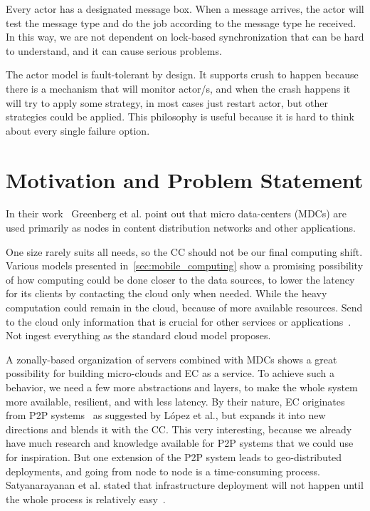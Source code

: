 Every actor has a designated message box. When a message arrives, the actor will test the message type and do the job according to the message type he received. In this way, we are not dependent on lock-based synchronization that can be hard to understand, and it can cause serious problems.

The actor model is fault-tolerant by design. It supports crush to happen because there is a  mechanism that will monitor actor/s, and when the crash happens it will try to apply some strategy, in most cases just restart actor, but other strategies could be applied. This philosophy is useful because it is hard to think about every single failure option.
%
%
\section{Motivation and Problem Statement}\label{sec:problem_statement}
%
In their work~\cite{GreenbergHMP09} Greenberg et al. point out that micro data-centers (MDCs) are used primarily as nodes in content distribution networks and other  applications.

One size rarely suits all needs, so the CC should not be our final computing shift. Various models presented in~\ref{sec:mobile_computing} show a promising possibility of how computing could be done closer to the data sources, to lower the latency for its clients by contacting the cloud only when needed. While the heavy computation could remain in the cloud, because of more available resources. Send to the cloud only information that is crucial for other services or applications~\cite{inproceedingsSimic1}. Not ingest everything as the standard cloud model proposes.

A zonally-based organization of servers combined with MDCs shows a great possibility for building micro-clouds and EC as a service. To achieve such a behavior, we need a few more abstractions and layers, to make the whole system more available, resilient, and with less latency. By their nature, EC originates from P2P systems~\cite{LopezMEDHIBFR15} as suggested by L{\'{o}}pez et al., but expands it into new directions and blends it with the CC. This very interesting, because we already have much research and knowledge available for P2P systems that we could use for inspiration. But one extension of the P2P system leads to geo-distributed deployments, and going from node to node is a time-consuming process. Satyanarayanan et al. stated that infrastructure deployment will not happen until the whole process is relatively easy~\cite{SatyanarayananBCD09}. 

